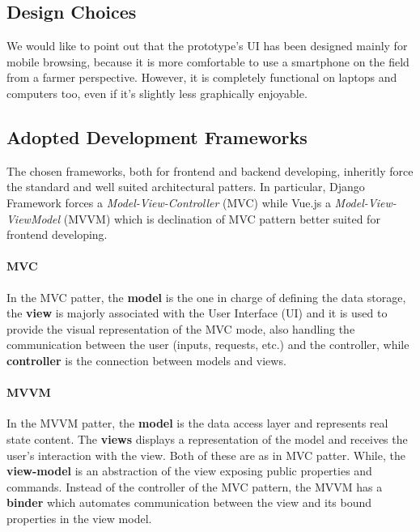 \documentclass[table, 12pt]{article}
\begin{document}
\subsection{Design Choices}
We would like to point out that the prototype's UI has been designed mainly for mobile browsing, because it is more comfortable to use a smartphone on the field from a farmer perspective. However, it is completely functional on laptops and computers too, even if it's slightly less graphically enjoyable.

\subsection{Adopted Development Frameworks}
The chosen frameworks, both for frontend and backend developing, inheritly force the standard and well suited architectural patters. In particular, Django Framework forces a \emph{Model-View-Controller} (MVC) while Vue.js a \emph{Model-View-ViewModel} (MVVM) which is declination of MVC pattern better suited for frontend developing. 

\paragraph{MVC} In the MVC patter, the \textbf{model} is the one in charge of defining the data storage, the \textbf{view} is majorly associated with the User Interface (UI) and it is used to provide the visual representation of the MVC mode, also handling the communication between the user (inputs, requests, etc.) and the controller, while \textbf{controller} is the connection between models and views.

\paragraph{MVVM} In the MVVM patter, the \textbf{model} is the data access layer and represents real state content. The \textbf{views} displays a representation of the model and receives the user's interaction with the view. Both of these are as in MVC patter. While, the \textbf{view-model} is an abstraction of the view exposing public properties and commands. Instead of the controller of the MVC pattern, the MVVM has a \textbf{binder} which automates communication between the view and its bound properties in the view model.
\end{document}

